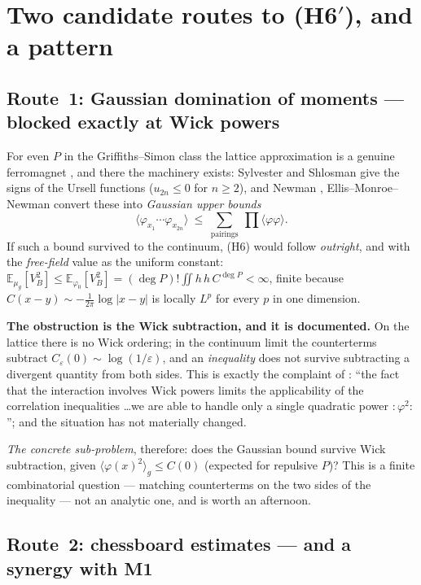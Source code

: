 \documentclass[11pt,a4paper]{article}
\theoremstyle{plain}
\theoremstyle{definition}
\begin{document}
\section{Two candidate routes to (H6$'$), and a pattern}\label{sec:routes}

\subsection*{Route~1: Gaussian domination of moments --- blocked exactly at Wick powers}

For even $P$ in the Griffiths--Simon class the lattice approximation is a genuine ferromagnet
\cite[\S IV.4]{GRS75}, and there the machinery exists: Sylvester \cite{Syl75} and Shlosman
\cite{Shl86} give the signs of the Ursell functions ($u_{2n}\le0$ for $n\ge2$), and Newman
\cite{New75}, Ellis--Monroe--Newman \cite{EMN76} convert these into \emph{Gaussian upper bounds}
\[
  \langle\varphi_{x_1}\cdots\varphi_{x_{2n}}\rangle\ \le\
  \sum_{\text{pairings}}\ \prod\langle\varphi\varphi\rangle .
\]
If such a bound survived to the continuum, (H6) would follow \emph{outright}, and with the
\emph{free-field} value as the uniform constant:
$\mathbb E_{\mu_g}[V_B^2]\le\mathbb E_{\varphi_0}[V_B^2]=(\deg P)!\iint h\,h\,C^{\deg P}<\infty$,
finite because $C(x-y)\sim-\tfrac1{2\pi}\log|x-y|$ is locally $L^p$ for every $p$ in one dimension.

\textbf{The obstruction is the Wick subtraction, and it is documented.} On the lattice there is no
Wick ordering; in the continuum limit the counterterms subtract $C_\varepsilon(0)\sim\log(1/\varepsilon)$,
and an \emph{inequality} does not survive subtracting a divergent quantity from both sides. This is
exactly the complaint of \cite[\S V.3]{GRS75}: ``the fact that the interaction involves Wick powers
limits the applicability of the correlation inequalities \dots we are able to handle only a single
quadratic power ${:}\varphi^2{:}$''; and the situation has not materially changed.

\emph{The concrete sub-problem}, therefore: does the Gaussian bound survive Wick subtraction, given
$\langle\varphi(x)^2\rangle_g\le C(0)$ (expected for repulsive $P$)? This is a finite combinatorial
question --- matching counterterms on the two sides of the inequality --- not an analytic one, and
is worth an afternoon.

\subsection*{Route~2: chessboard estimates --- and a synergy with M1}
\end{document}
